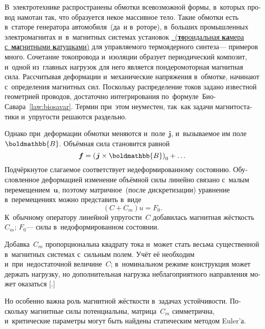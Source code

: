 \begin{otherlanguage}{russian}

В~электротехнике распространены обмотки всевозможной формы, в~которых провод намотан так, что образуется некое массивное тело. Такие обмотки есть в~статоре генератора автомобиля~(да~и в~роторе), в~больших промышленных электромагнитах и~в~магнитных системах установок \href{https://ru.wikipedia.org/wiki/%D0%A2%D0%BE%D0%BA%D0%B0%D0%BC%D0%B0%D0%BA}{\inquotes{токам\'{а}к}~(\textbf{то}роидальная \textbf{ка}мера с~\textbf{ма}гнитными \textbf{к}атушками)} для управляемого термоядерного синтеза\:--- примеров много. Сочетание токопровода и~изоляции образует периодический композит, и~одной из~главных нагрузок для него является пондеромоторная магнитная сила. Рассчитывая деформации и~механические напряжения в~обмотке, начинают с~определения магнитных сил. Поскольку распределение токов задано известной геометрией проводов, достаточно интегрирования по~формуле~Био\hbox{-}Савара~\eqref{law:biosavar}. Термин \inquotes{магнитоупругость} при~этом неуместен, так~как задачи магнитостатики и~упругости решаются раздельно.

Однако при~деформации обмотки меняются и~поле~$\bm{j}$, и~вызываемое им поле~$\boldmathbb{B}$. Объёмная сила становится равной
\begin{equation}
\bm{f} = \left( \hspace{0.16ex} \bm{j} \times \boldmathbb{B} \right)_0 + \dots
\end{equation}
\noindent Подчёркнутое слагаемое соответствует недеформированному состоянию. Обусловленное деформацией изменение объёмной силы линейно связано с~малым перемещением~$\bm{u}$, поэтому матричное~(после дискретизации) уравнение в~перемещениях можно представить в~виде
\begin{equation}
\left( C + C_m \right) u = F_0 .
\end{equation}
\noindent К~обычному оператору линейной упругости~$C$ добавилась магнитная жёсткость~$C_m$; $F_0$\:--- силы в~недоформированном состоянии.

Добавка~$C_m$ пропорциональна квадрату тока и~может стать весьма существенной в~магнитных системах с~сильным полем. Учёт её необходим и~при~недостаточной величине~$C$; в~номинальном режиме конструкция может держать нагрузку, но дополнительная нагрузка неблагоприятного направления может оказаться [.]

Но особенно важна роль магнитной жёсткости в~задачах устойчивости. Поскольку магнитные силы потенциальны, матрица~$C_m$ симметрична, и~критические параметры могут быть найдены статическим методом Euler’а.


\end{otherlanguage}

